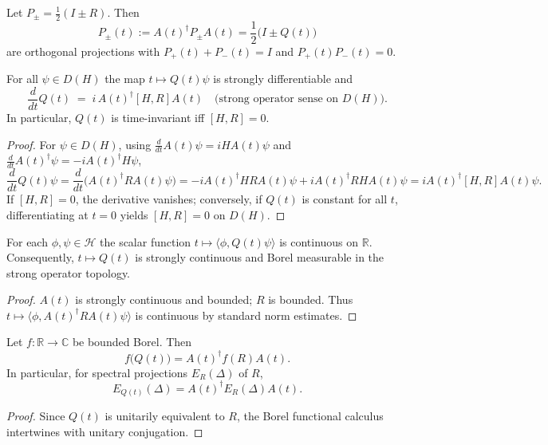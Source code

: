 \begin{corollary}
Let $P_\pm=\frac12(I\pm R)$. Then
\[
P_\pm(t):=A(t)^\dagger P_\pm A(t)=\frac12\big(I\pm Q(t)\big)
\]
are orthogonal projections with $P_+(t)+P_-(t)=I$ and $P_+(t)P_-(t)=0$.
\end{corollary}

\begin{lemma}
For all $\psi\in D(H)$ the map $t\mapsto Q(t)\psi$ is strongly differentiable and
\[
\frac{d}{dt}Q(t)\;=\;i\,A(t)^\dagger[H,R]A(t)\quad\text{(strong operator sense on $D(H)$)}.
\]
In particular, $Q(t)$ is time-invariant iff $[H,R]=0$.
\end{lemma}

\begin{proof}
For $\psi\in D(H)$, using $\frac{d}{dt}A(t)\psi=iHA(t)\psi$ and $\frac{d}{dt}A(t)^\dagger\psi=-iA(t)^\dagger H\psi$,
\[
\frac{d}{dt}Q(t)\psi
= \frac{d}{dt}\big(A(t)^\dagger R A(t)\psi\big)
= -iA(t)^\dagger H R A(t)\psi + iA(t)^\dagger R H A(t)\psi
= iA(t)^\dagger[H,R]A(t)\psi.
\]
If $[H,R]=0$, the derivative vanishes; conversely, if $Q(t)$ is constant for all $t$, differentiating at $t=0$ yields $[H,R]=0$ on $D(H)$.
\end{proof}

\begin{lemma}
For each $\phi,\psi\in\mathcal{H}$ the scalar function $t\mapsto \langle\phi,Q(t)\psi\rangle$ is continuous on $\mathbb{R}$.
Consequently, $t\mapsto Q(t)$ is strongly continuous and Borel measurable in the strong operator topology.
\end{lemma}

\begin{proof}
$A(t)$ is strongly continuous and bounded; $R$ is bounded.
Thus $t\mapsto \langle\phi, A(t)^\dagger R A(t)\psi\rangle$ is continuous by standard norm estimates.
\end{proof}

\begin{proposition}
Let $f:\mathbb{R}\to\mathbb{C}$ be bounded Borel. Then
\[
f\big(Q(t)\big)=A(t)^\dagger f(R) A(t).
\]
In particular, for spectral projections $E_R(\Delta)$ of $R$,
\[
E_{Q(t)}(\Delta)=A(t)^\dagger E_R(\Delta) A(t).
\]
\end{proposition}

\begin{proof}
Since $Q(t)$ is unitarily equivalent to $R$, the Borel functional calculus intertwines with unitary conjugation.
\end{proof}

